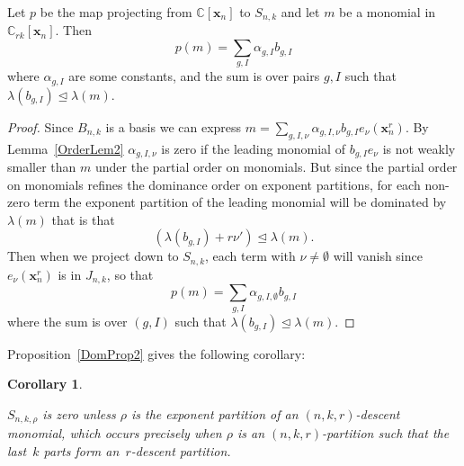 \documentclass[10pt]{article}
\newtheorem{coro}[thm]{Corollary}
\begin{document}
\begin{prop}
\label{DomProp2}
	Let $p$ be the map projecting from $\mathbb{C}[\mathbf{x}_n]$ to $S_{n,k}$ and let $m$ be a monomial in 
$\mathbb{C}_{rk}[\mathbf{x}_n]$. Then
\begin{equation}
p(m)=\sum_{g,I} \alpha_{g,I} b_{g,I}
\end{equation}
where 
$\alpha_{g,I}$ are some constants, and the sum is over pairs $g,I$ such that $\lambda(b_{g,I})\trianglelefteq \lambda(m)$.

	\begin{proof}
		Since $B_{n,k}$ is a basis we can express $m=\sum_{g,I,\nu} \alpha_{g,I,\nu} b_{g,I} e_\nu(\mathbf{x}_n^r)$. By Lemma~\ref{OrderLem2} $\alpha_{g,I,\nu}$ is zero if the leading monomial of $b_{g,I}e_\nu$ is not weakly smaller than $m$ 
under the partial order on monomials. But since the partial order on monomials refines the dominance order on exponent 
partitions, for each non-zero term the exponent partition of the leading monomial will be dominated by $\lambda(m)$ 
that is that
\begin{equation}
(\lambda(b_{g,I})+r\nu')\trianglelefteq \lambda(m).
\end{equation}
 Then when we project down 
to $S_{n,k}$, each term with $\nu\neq \emptyset$ will vanish since $e_\nu(\mathbf{x}_n^r)$ is in $J_{n,k}$, so 
that
\begin{equation}
p(m)=\sum_{g,I}\alpha_{g,I,\emptyset} b_{g,I}
\end{equation}
where the sum is over $(g,I)$ such that 
$\lambda(b_{g,I})\trianglelefteq \lambda(m)$.
	\end{proof}

\end{prop}

Proposition~\ref{DomProp2} gives the following corollary:


\begin{coro}
\label{zero2}

	$S_{n,k,\rho}$ is zero unless $\rho$ is the exponent partition of an $(n,k,r)$-descent monomial, which occurs precisely 
when $\rho$ is an $(n,k,r)$-partition such that the last~$k$ parts form an~$r$-descent partition.

\end{coro}
\end{document}
